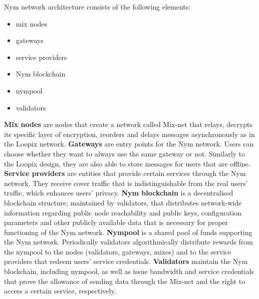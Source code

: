 Nym network architecture consists of the following elements:
\begin{itemize}
    \item mix nodes
    \item gateways
    \item service providers
    \item Nym blockchain
    \item nympool
    \item validators
\end{itemize}

\textbf{Mix nodes} are nodes that create a network called Mix-net that relays, decrypts its specific layer of encryption, reorders and delays messages asynchronously as in the Loopix network. \textbf{Gateways} are entry points for the Nym network. Users can choose whether they want to always use the same gateway or not. Similarly to the Loopix design, they are also able to store messages for users that are offline. \textbf{Service providers} are entities that provide certain services through the Nym network. They receive cover traffic that is indistinguishable from the real users’ traffic, which enhances users’ privacy. \textbf{Nym blockchain} is a decentralised blockchain structure, maintained by validators, that distributes network-wide information regarding public node reachability and public keys, configuration parameters and other publicly available data that is necessary for proper functioning of the Nym network. \textbf{Nympool} is a shared pool of funds supporting the Nym network. Periodically validators algorithmically distribute rewards from the nympool to the nodes (validators, gateways, mixes) and to the service providers that redeem users’ service credentials. \textbf{Validators} maintain the Nym blockchain, including nympool, as well as issue bandwidth and service credentials that prove the allowance of sending data through the Mix-net and the right to access a certain service, respectively.

